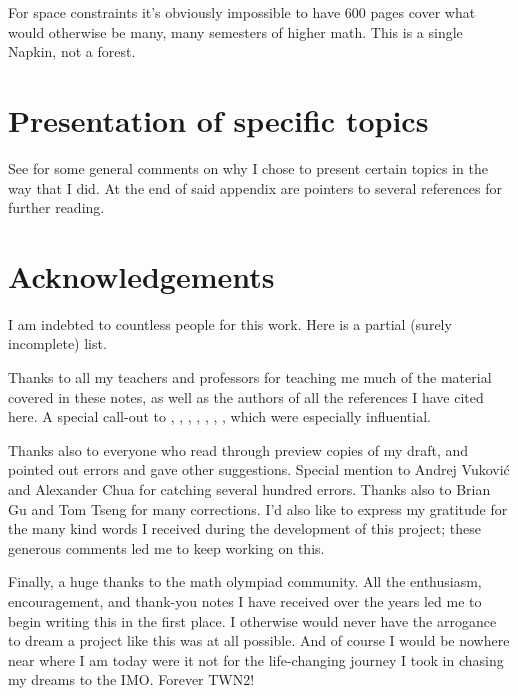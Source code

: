For space constraints it's obviously impossible to have 600 pages cover
what would otherwise be many, many semesters of higher math.
This is a single Napkin, not a forest.

\section*{Presentation of specific topics}
See  for some general comments on why I chose
to present certain topics in the way that I did.
At the end of said appendix are pointers to
several references for further reading.

\section*{Acknowledgements}
I am indebted to countless people for this work.
Here is a partial (surely incomplete) list.

Thanks to all my teachers and professors for teaching me much of the
material covered in these notes,
as well as the authors of all the references I have cited here.
A special call-out to \cite{ref:55a}, \cite{ref:msci},
\cite{ref:manifolds}, \cite{ref:gathmann}, \cite{ref:18-435},
\cite{ref:etingof}, \cite{ref:145a}, which were especially influential.

Thanks also to everyone who read through preview copies of my draft,
and pointed out errors and gave other suggestions.
Special mention to Andrej Vukovi\'c and Alexander Chua for catching several hundred errors.
Thanks also to Brian Gu and Tom Tseng for many corrections.
I'd also like to express my gratitude for the many kind words I received
during the development of this project;
these generous comments led me to keep working on this.

Finally, a huge thanks to the math olympiad community.
All the enthusiasm, encouragement, and thank-you notes I have received
over the years led me to begin writing this in the first place.
I otherwise would never have the arrogance to dream a project like this
was at all possible.
And of course I would be nowhere near where I am today were it not for the
life-changing journey I took in chasing my dreams to the IMO.
Forever TWN2!
